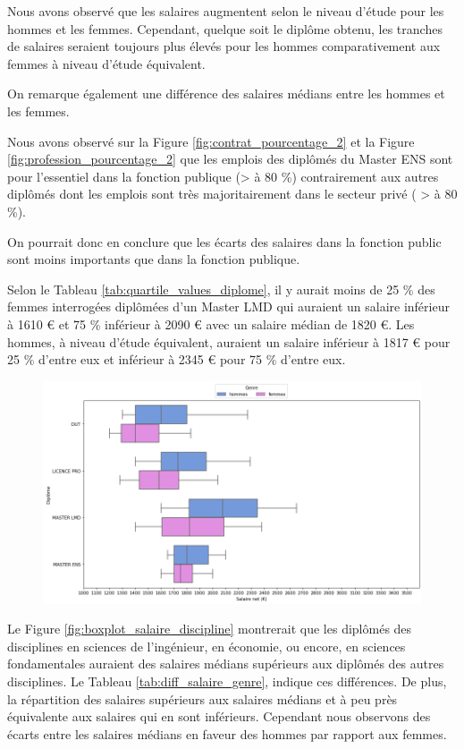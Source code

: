 \documentclass[12pt, a4paper, titlepage, table]{article}
\begin{document}
	Nous avons observé que les salaires augmentent selon le niveau d'étude pour les hommes et les femmes. Cependant, quelque soit le diplôme obtenu, les tranches de salaires seraient toujours plus élevés pour les hommes comparativement aux femmes à niveau d'étude équivalent.
	
	On remarque également une différence des salaires médians entre les hommes et les femmes. 
	
	Nous avons observé sur la Figure \ref{fig:contrat_pourcentage_2} et la Figure \ref{fig:profession_pourcentage_2} que les emplois des diplômés du Master ENS sont pour l'essentiel dans la fonction publique (> à 80 \%) contrairement aux autres diplômés dont les emplois sont très majoritairement dans le secteur privé ( >  à 80 \%).
	
	On pourrait donc en conclure que les écarts des salaires dans la fonction public sont moins importants que dans la fonction publique.
	
	Selon le Tableau \ref{tab:quartile_values_diplome}, il y aurait moins de 25 \% des femmes interrogées diplômées d'un Master LMD qui auraient un salaire inférieur à 1610 € et 75 \% inférieur à 2090 € avec un salaire médian de 1820 €.
	Les hommes, à niveau d'étude équivalent, auraient un salaire inférieur à 1817 € pour 25 \% d'entre eux et inférieur à 2345 € pour 75 \% d'entre eux.
	

	\begin{figure}[H]
		\centering
		\includegraphics[width=1\textwidth]{../graphs/boxplot_diplomes_genre.png}
		\label{fig:boxplot_diplome_genre}
	\end{figure}

	Le Figure \ref{fig:boxplot_salaire_discipline} montrerait que les diplômés des disciplines en sciences de l'ingénieur, en économie, ou encore, en sciences fondamentales auraient des salaires médians supérieurs aux diplômés des autres disciplines. Le Tableau \ref{tab:diff_salaire_genre}, indique ces différences. De plus, la répartition des salaires supérieurs aux salaires médians et à peu près équivalente aux salaires qui en sont inférieurs. Cependant nous observons des écarts entre les salaires médians en faveur des hommes par rapport aux femmes.
	
\end{document}
